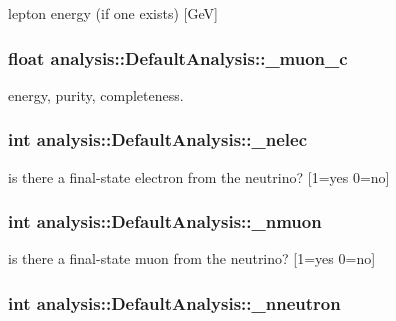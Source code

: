 lepton energy (if one exists) \mbox{[}Ge\-V\mbox{]} \hypertarget{classanalysis_1_1DefaultAnalysis_ac6226239ce3915d1363f8038583e8960}{
\subsubsection[{\-\_\-muon\-\_\-c}]{\setlength{\rightskip}{0pt plus 5cm}float analysis\-::\-Default\-Analysis\-::\-\_\-muon\-\_\-c\hspace{0.3cm}{\ttfamily [private]}}}\label{classanalysis_1_1DefaultAnalysis_ac6226239ce3915d1363f8038583e8960}
energy, purity, completeness. \hypertarget{classanalysis_1_1DefaultAnalysis_a6aa372d8781339f60a044c92d974ae53}{
\subsubsection[{\-\_\-nelec}]{\setlength{\rightskip}{0pt plus 5cm}int analysis\-::\-Default\-Analysis\-::\-\_\-nelec\hspace{0.3cm}{\ttfamily [private]}}}\label{classanalysis_1_1DefaultAnalysis_a6aa372d8781339f60a044c92d974ae53}
is there a final-\/state electron from the neutrino? \mbox{[}1=yes 0=no\mbox{]} \hypertarget{classanalysis_1_1DefaultAnalysis_a6adae9dc9394640a78756a1da65b2162}{
\subsubsection[{\-\_\-nmuon}]{\setlength{\rightskip}{0pt plus 5cm}int analysis\-::\-Default\-Analysis\-::\-\_\-nmuon\hspace{0.3cm}{\ttfamily [private]}}}\label{classanalysis_1_1DefaultAnalysis_a6adae9dc9394640a78756a1da65b2162}
is there a final-\/state muon from the neutrino? \mbox{[}1=yes 0=no\mbox{]} \hypertarget{classanalysis_1_1DefaultAnalysis_afb7f9e564492c71227112ce13f52ce9c}{
\subsubsection[{\-\_\-nneutron}]{\setlength{\rightskip}{0pt plus 5cm}int analysis\-::\-Default\-Analysis\-::\-\_\-nneutron\hspace{0.3cm}{\ttfamily [private]}}}\label{classanalysis_1_1DefaultAnalysis_afb7f9e564492c71227112ce13f52ce9c}

